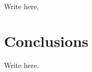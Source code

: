 \documentclass[10pt]{article}
\begin{document}
Write here. 





\section{Conclusions}

Write here. 




\end{document}
